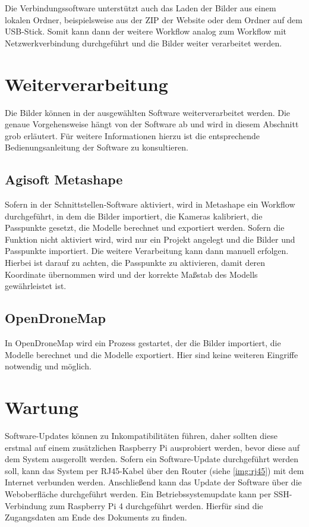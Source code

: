 \documentclass[./00PhotoBox.tex]{subfiles}
\begin{document}
Die Verbindungssoftware unterstützt auch das Laden der Bilder aus einem lokalen Ordner, beispielsweise aus der ZIP der Website oder dem Ordner auf dem USB-Stick. Somit kann dann der weitere Workflow analog zum Workflow mit Netzwerkverbindung durchgeführt und die Bilder weiter verarbeitet werden.

\section{Weiterverarbeitung}
Die Bilder können in der ausgewählten Software weiterverarbeitet werden. Die genaue Vorgehensweise hängt von der Software ab und wird in diesem Abschnitt grob erläutert. Für weitere Informationen hierzu ist die entsprechende Bedienungsanleitung der Software zu konsultieren.

\subsection{Agisoft Metashape}
Sofern in der Schnittstellen-Software aktiviert, wird in Metashape ein Workflow durchgeführt, in dem die Bilder importiert, die Kameras kalibriert, die Passpunkte gesetzt, die Modelle berechnet und exportiert werden. Sofern die Funktion nicht aktiviert wird, wird nur ein Projekt angelegt und die Bilder und Passpunkte importiert. Die weitere Verarbeitung kann dann manuell erfolgen. Hierbei ist darauf zu achten, die Passpunkte zu aktivieren, damit deren Koordinate übernommen wird und der korrekte Maßstab des Modells gewährleistet ist.

\subsection{OpenDroneMap}
In OpenDroneMap wird ein Prozess gestartet, der die Bilder importiert, die Modelle berechnet und die Modelle exportiert. Hier sind keine weiteren Eingriffe notwendig und möglich. 


\section{Wartung}
Software-Updates können zu Inkompatibilitäten führen, daher sollten diese erstmal auf einem zusätzlichen Raspberry Pi ausprobiert werden, bevor diese auf dem System ausgerollt werden. Sofern ein Software-Update durchgeführt werden soll, kann das System per RJ45-Kabel über den Router (siehe \autoref{img:rj45}) mit dem Internet verbunden werden. Anschließend kann das Update der Software über die Weboberfläche durchgeführt werden. Ein Betriebssystemupdate kann per SSH-Verbindung zum Raspberry Pi 4 durchgeführt werden. Hierfür sind die Zugangsdaten am Ende des Dokuments zu finden.
\end{document}

